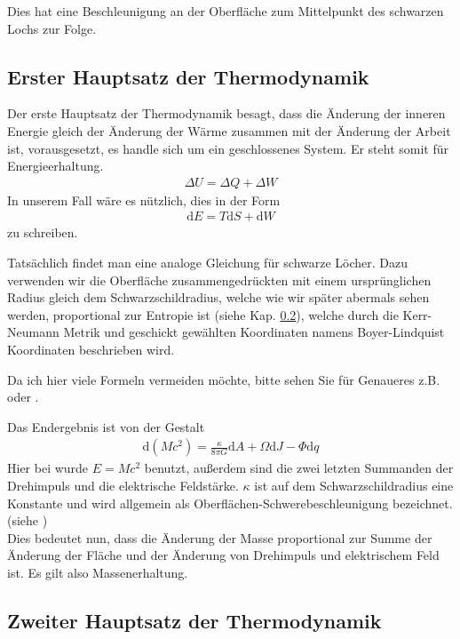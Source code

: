 \documentclass[ngerman]{scrartcl}
\newcommand{\diff}{\mathrm{d}}
\begin{document}
	Dies hat eine Beschleunigung an der Oberfläche zum Mittelpunkt des schwarzen Lochs zur Folge. 

	\subsection{Erster Hauptsatz der Thermodynamik}
	Der erste Hauptsatz der Thermodynamik besagt, dass die Änderung der inneren Energie gleich der Änderung der Wärme zusammen mit der Änderung der Arbeit ist, vorausgesetzt, es handle sich um ein geschlossenes System. Er steht somit für Energieerhaltung.
		\begin{align}
			\Delta U = \Delta Q + \Delta W
		\end{align}
	In unserem Fall wäre es nützlich, dies in der Form
		\begin{align}
			\diff E = T\diff S + \diff W
		\end{align}
	zu schreiben. 
	
	Tatsächlich findet man eine analoge Gleichung für schwarze Löcher.
	Dazu verwenden wir die Oberfläche zusammengedrückten mit einem ursprünglichen Radius gleich dem Schwarzschildradius, welche wie wir später abermals sehen werden, proportional zur Entropie ist (siehe Kap. \ref{zweiterHS}), welche durch die Kerr-Neumann Metrik und geschickt gewählten Koordinaten namens Boyer-Lindquist Koordinaten beschrieben wird. 
	
	Da ich hier viele Formeln vermeiden möchte, bitte sehen Sie für Genaueres z.B. \cite{BekensteinHawking} oder \cite{Gebhardt}.
	
	Das Endergebnis ist von der Gestalt
		\begin{align}
			\diff (Mc^2) = \frac{\kappa}{8 \pi G} \diff A + \Omega \diff J - \Phi \diff q
		\end{align} 
	Hier bei wurde $E = Mc^2$ benutzt, außerdem sind die zwei letzten Summanden der Drehimpuls und die elektrische Feldstärke. $\kappa$ ist auf dem Schwarzschildradius eine Konstante und wird allgemein als Oberflächen-Schwerebeschleunigung bezeichnet. (siehe \cite{Gebhardt})
	\\
	
	Dies bedeutet nun, dass die Änderung der Masse proportional zur Summe der Änderung der Fläche und der Änderung von Drehimpuls und elektrischem Feld ist. Es gilt also Massenerhaltung. 

	\subsection{Zweiter Hauptsatz der Thermodynamik} \label{zweiterHS}
	
\end{document}
